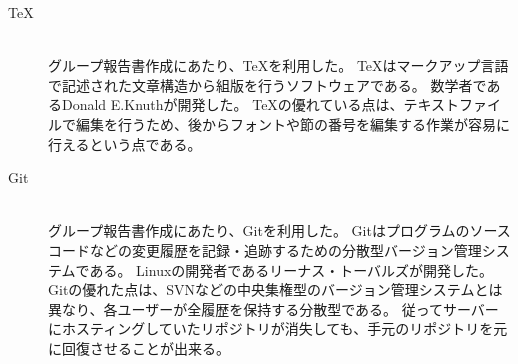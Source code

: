 \documentclass[../report]{subfiles}
\begin{document}
\begin{description}
    \item[TeX] \mbox{} \\
        グループ報告書作成にあたり、TeXを利用した。
        TeXはマークアップ言語で記述された文章構造から組版を行うソフトウェアである。
        数学者であるDonald E.Knuthが開発した。
        TeXの優れている点は、テキストファイルで編集を行うため、後からフォントや節の番号を編集する作業が容易に行えるという点である。
    \item[Git] \mbox{} \\
        グループ報告書作成にあたり、Gitを利用した。
        Gitはプログラムのソースコードなどの変更履歴を記録・追跡するための分散型バージョン管理システムである。
        Linuxの開発者であるリーナス・トーバルズが開発した。
        Gitの優れた点は、SVNなどの中央集権型のバージョン管理システムとは異なり、各ユーザーが全履歴を保持する分散型である。
        従ってサーバーにホスティングしていたリポジトリが消失しても、手元のリポジトリを元に回復させることが出来る。
\end{description}
\end{document}

